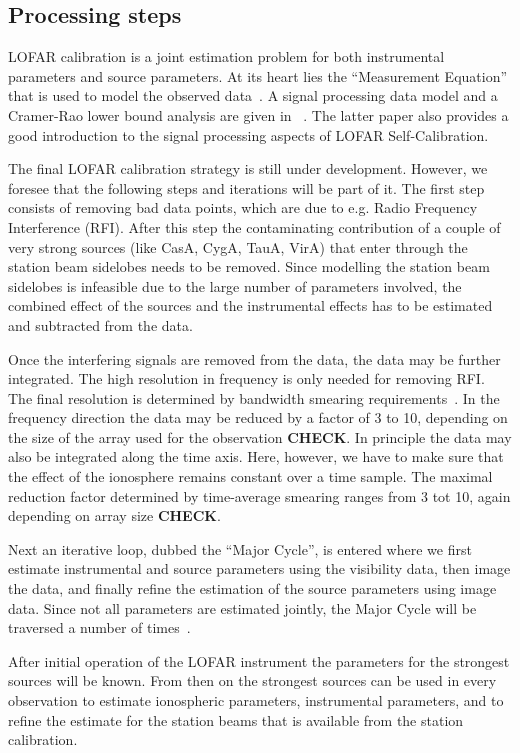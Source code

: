 \documentclass[journal]{IEEEtran}
\begin{document}
\subsection{Processing steps}

LOFAR calibration is a joint estimation problem for both instrumental parameters and source parameters. At its heart lies the ``Measurement Equation'' that is used to model the observed data~\cite{Hamaker:96}. A signal processing data model and a Cramer-Rao lower bound analysis are given in ~\cite{Tol:07}. The latter paper also provides a good introduction to the signal processing aspects of LOFAR Self-Calibration.   

\label{sec:RFI}
The final LOFAR calibration strategy is still under development. However, we foresee that the following steps and iterations will be part of it. The first step consists of removing bad data points, which are due to e.g. Radio Frequency Interference (RFI). After this step the contaminating contribution of a couple of very strong sources (like CasA, CygA, TauA, VirA) that enter through the station beam sidelobes needs to be removed. Since modelling the station beam sidelobes is infeasible due to the large number of parameters involved, the combined effect of the sources and the instrumental effects has to be estimated and subtracted from the data. 

Once the interfering signals are removed from the data, the data may be further integrated. The high resolution in frequency is only needed for removing RFI. The final resolution is determined by bandwidth smearing requirements~\cite{SIRAII:99}. In the frequency direction the data may be reduced by a factor of 3 to 10, depending on the size of the array used for the observation {\bf CHECK}. In principle the data may also be integrated along the time axis. Here, however, we have to make sure that the effect of the ionosphere remains constant over a time sample. The maximal reduction factor determined by time-average smearing ranges from 3 tot 10, again depending on array size {\bf CHECK}.

Next an iterative loop, dubbed the ``Major Cycle'', is entered where we first estimate instrumental and source parameters using the visibility data, then image the data, and finally refine the estimation  of the source parameters using image data. Since not all parameters are estimated jointly, the Major Cycle will be traversed a number of times~\cite{Nijboer:07}. 

After initial operation of the LOFAR instrument the parameters for the strongest sources will be known. From then on the strongest sources can be used in every observation to estimate ionospheric parameters, instrumental parameters, and to refine the estimate for the station beams that is available from the station calibration. 
\end{document}
